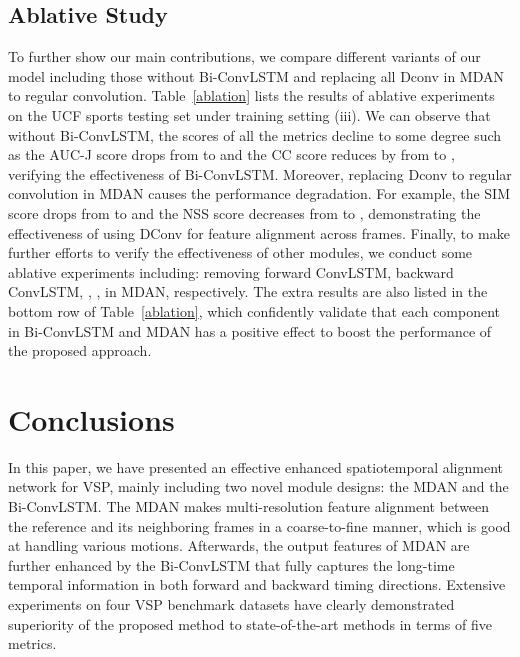 \documentclass[review]{elsarticle}
\begin{document}
\subsection{Ablative Study}
To further show our main contributions, we compare different variants of our model including those without Bi-ConvLSTM and replacing all Dconv in MDAN to regular convolution.
Table~\ref{ablation} lists the results of ablative experiments on the UCF sports testing set under training setting (iii).
We can observe that without Bi-ConvLSTM, the scores of all the metrics decline to some degree such as the AUC-J score drops from  to  and the CC score reduces by  from  to , verifying the effectiveness of Bi-ConvLSTM.
Moreover, replacing Dconv to regular convolution in MDAN causes the performance degradation.
For example, the SIM score drops from  to  and the NSS score decreases from  to , demonstrating the effectiveness of using DConv for feature alignment across frames.
Finally, to make further efforts to verify the effectiveness of other modules, we conduct some ablative experiments including: removing forward ConvLSTM, backward ConvLSTM, , ,  in MDAN, respectively.
The extra results are also listed in the bottom row of Table~\ref{ablation}, which confidently validate that each component in Bi-ConvLSTM and MDAN has a positive effect to boost the performance of the proposed approach.


\section{Conclusions}
In this paper, we have presented an effective enhanced spatiotemporal alignment network for VSP, mainly including two novel module designs: the MDAN and the Bi-ConvLSTM.
The MDAN makes multi-resolution feature alignment between the reference and its neighboring frames in a coarse-to-fine manner, which is good at handling various motions.
Afterwards, the output features of MDAN are further enhanced by the Bi-ConvLSTM that fully captures the long-time temporal information in both forward and backward timing directions.
Extensive experiments on four VSP benchmark datasets have clearly demonstrated superiority of the proposed method to state-of-the-art methods in terms of five metrics.


\end{document}
